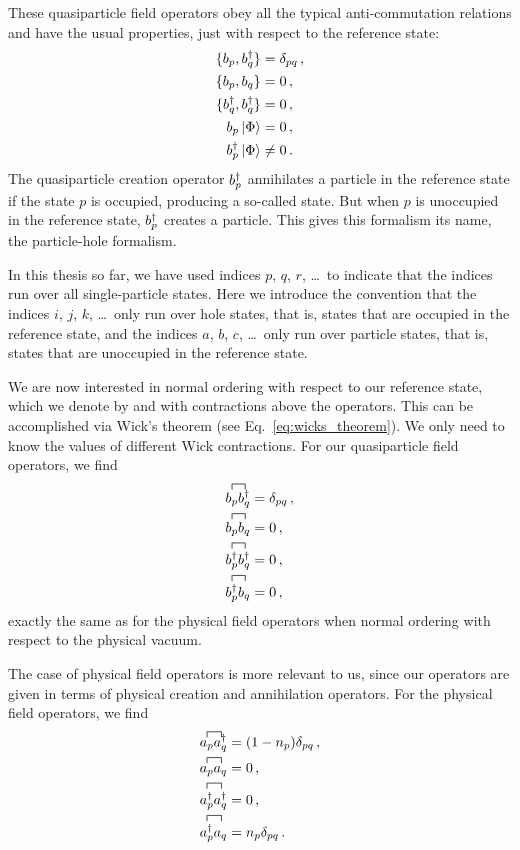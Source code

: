 These quasiparticle field operators obey all the typical anti-commutation relations
and have the usual properties, just with respect to the reference state:
\begin{align}
  \{b_{p}, b_{q}^{\dagger}\} &= \delta_{pq}\,,\\
  \{b_{p}, b_{q}\} & = 0 \,, \\
  \{b_{q}^{\dagger}, b_{q}^{\dagger}\} &= 0\,, \\
  b_{p} \ket{\Phi} &= 0\,, \\
  b_{p}^{\dagger} \ket{\Phi} & \neq 0\,.
\end{align}
The quasiparticle creation operator $b_{p}^{\dagger}$
annihilates a particle in the reference state if the state $p$ is occupied,
producing a so-called  state.
But when $p$ is unoccupied in the reference state,
$b_{p}^{\dagger}$ creates a particle.
This gives this formalism its name, the particle-hole formalism.

In this thesis so far,
we have used indices $p$, $q$, $r$, \ldots\ to indicate that
the indices run over all single-particle states.
Here we introduce the convention that the indices $i$, $j$, $k$, \ldots\
only run over hole states, that is, states that are occupied in the reference state,
and the indices $a$, $b$, $c$, \ldots\ only run over particle states,
that is, states that are unoccupied in the reference state.

We are now interested in normal ordering with respect to our reference state,
which we denote by \noref{\ldots} and with contractions above the operators.
This can be accomplished via Wick's theorem (see Eq.~\ref{eq:wicks_theorem}).
We only need to know the values of different Wick contractions.
For our quasiparticle field operators, we find
\begin{align}
  \acontraction{}{\qpannih{p}}{}{\qpcrea{q}} \qpannih{p}\qpcrea{q} & =  \delta_{pq}\,, \\
  \acontraction{}{\qpannih{p}}{}{\qpannih{q}} \qpannih{p}\qpannih{q} &= 0\,, \\
  \acontraction{}{\qpcrea{p}}{}{\qpcrea{q}} \qpcrea{p}\qpcrea{q} &= 0\,, \\
  \acontraction{}{\qpcrea{p}}{}{\qpannih{q}} \qpcrea{p}\qpannih{q} &= 0\,,
\end{align}
exactly the same as for the physical field operators
when normal ordering with respect to the physical vacuum.

The case of physical field operators is more relevant to us,
since our operators are given in terms of physical creation and annihilation operators.
For the physical field operators, we find
\begin{align}
  \acontraction{}{\annih{p}}{}{\crea{q}} \annih{p}\crea{q} & = (1 - n_p) \delta_{pq}\,, \\
  \acontraction{}{\annih{p}}{}{\annih{q}} \annih{p}\annih{q} &= 0\,, \\
  \acontraction{}{\crea{p}}{}{\crea{q}} \crea{p}\crea{q} &= 0\,, \\
  \acontraction{}{\crea{p}}{}{\annih{q}} \crea{p}\annih{q} &= n_p \delta_{pq}\,.
\end{align}

